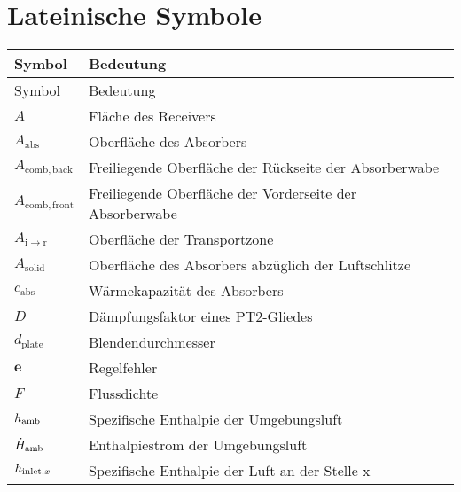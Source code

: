\section*{Lateinische Symbole}
\begin{longtable}{p{}p{}}
    Symbol                           & Bedeutung                                                        \\
    \hline
    \endfirsthead
    Symbol                           & Bedeutung                                                        \\
    \hline
    \endhead
    \endfoot
    \endlastfoot
    $A$                              & Fläche des Receivers                                             \\
    $A_{\mathrm{abs}}$               & Oberfläche des Absorbers                                         \\
    $A_{\mathrm{comb,back}}$         & Freiliegende Oberfläche der Rückseite der Absorberwabe           \\
    $A_{\mathrm{comb,front}}$        & Freiliegende Oberfläche der Vorderseite der Absorberwabe         \\
    $A_{\mathrm{i\to r}}$            & Oberfläche der Transportzone                                     \\
    $A_{\mathrm{solid}}$             & Oberfläche des Absorbers abzüglich der Luftschlitze              \\
    $c_{\mathrm{abs}}$               & Wärmekapazität des Absorbers                                     \\
    $D$                              & Dämpfungsfaktor eines PT2-Gliedes                                \\
    $d_{\mathrm{plate}}$             & Blendendurchmesser                                               \\
    $\boldsymbol{e}$                 & Regelfehler                                                      \\
    $F$                              & Flussdichte                                                      \\
    $h_{\mathrm{amb}}$      & Spezifische Enthalpie der Umgebungsluft                          \\
    $\dot{H}_{\mathrm{amb}}$          & Enthalpiestrom der Umgebungsluft                                 \\
    $h_{\mathrm{inlet,}x}$     & Spezifische Enthalpie der Luft an der Stelle x                   \\

\end{longtable}
